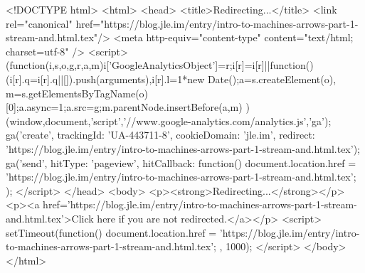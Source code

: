 <!DOCTYPE html>
<html>
<head>
<title>Redirecting...</title>
<link rel="canonical" href="https://blog.jle.im/entry/intro-to-machines-arrows-part-1-stream-and.html.tex"/>
<meta http-equiv="content-type" content="text/html; charset=utf-8" />
<script>
(function(i,s,o,g,r,a,m){i['GoogleAnalyticsObject']=r;i[r]=i[r]||function(){
(i[r].q=i[r].q||[]).push(arguments)},i[r].l=1*new Date();a=s.createElement(o),
m=s.getElementsByTagName(o)[0];a.async=1;a.src=g;m.parentNode.insertBefore(a,m)
})(window,document,'script','//www.google-analytics.com/analytics.js','ga');
ga('create', { trackingId: 'UA-443711-8', cookieDomain: 'jle.im', redirect: 'https://blog.jle.im/entry/intro-to-machines-arrows-part-1-stream-and.html.tex'});
ga('send', { hitType: 'pageview', hitCallback: function() { document.location.href = 'https://blog.jle.im/entry/intro-to-machines-arrows-part-1-stream-and.html.tex'; } });
</script>
</head>
<body>
  <p><strong>Redirecting...</strong></p>
  <p><a href='https://blog.jle.im/entry/intro-to-machines-arrows-part-1-stream-and.html.tex'>Click here if you are not redirected.</a></p>
  <script>
    setTimeout(function() { document.location.href = 'https://blog.jle.im/entry/intro-to-machines-arrows-part-1-stream-and.html.tex'; }, 1000);
  </script>
</body>
</html>
